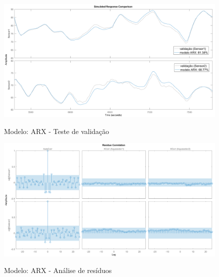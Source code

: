 \begin{figure}[h]
	\caption{Modelo: ARX - Teste de validação}
	\begin{center}
		\includegraphics[width=1.00\textwidth]{./5_images/tclabsp-models-ARX-compare.png} 
		\label{fig:tclabsp-models-arx-compare}
	\end{center}
	\centering
\end{figure}

\begin{figure}[h]
	\caption{Modelo: ARX - Análise de resíduos}
	\begin{center}
		\includegraphics[width=1.00\textwidth]{./5_images/tclabsp-models-ARX-resid.png} 
		\label{fig:tclabsp-models-arx-resid}
	\end{center}
	\centering
\end{figure}

